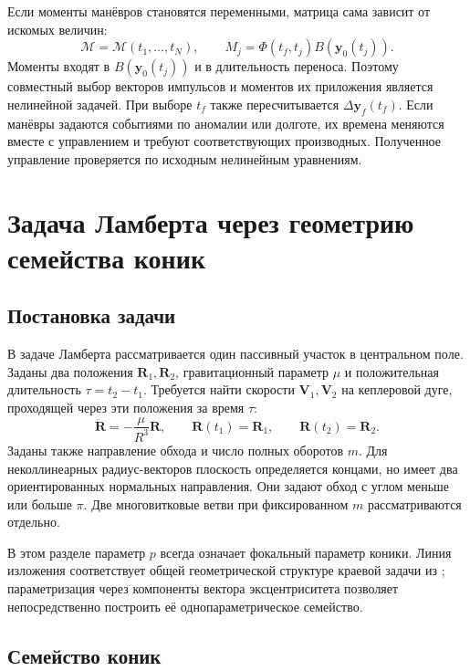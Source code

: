 \documentclass[a4paper,11pt]{article}
\numberwithin{equation}{section}
\theoremstyle{remark}
\newcommand{\vect}[1]{\boldsymbol{#1}}
\begin{document}
Если моменты манёвров становятся переменными, матрица сама
зависит от искомых величин:
\begin{equation}
 \mathcal M=\mathcal M(t_1,\ldots,t_N),\qquad
 M_j=\Phi(t_f,t_j)B(\vect y_0(t_j)).
 \label{eq:free-epochs}
\end{equation}
Моменты входят в $B(\vect y_0(t_j))$ и в длительность переноса.
Поэтому совместный выбор векторов импульсов и моментов
их приложения является нелинейной задачей. При выборе $t_f$ также пересчитывается
$\Delta\vect y_f(t_f)$. Если манёвры задаются событиями
по аномалии или долготе, их времена меняются вместе
с управлением и требуют соответствующих производных.
Полученное управление проверяется по исходным нелинейным уравнениям.

\FloatBarrier
\section{Задача Ламберта через геометрию семейства коник}
\label{sec:lambert}

\subsection{Постановка задачи}

В задаче Ламберта рассматривается один пассивный участок
в центральном поле. Заданы два положения $\vect R_1,\vect R_2$,
гравитационный параметр $\mu$ и положительная длительность
$\tau=t_2-t_1$. Требуется найти скорости $\vect V_1,\vect V_2$
на кеплеровой дуге, проходящей через эти положения за время $\tau$:
\begin{equation}
 \ddot{\vect R}=-\frac{\mu}{R^3}\vect R,
 \qquad \vect R(t_1)=\vect R_1,\qquad
 \vect R(t_2)=\vect R_2.
 \label{eq:lambert-boundary}
\end{equation}
Заданы также направление обхода и число полных оборотов $m$.
Для неколлинеарных радиус-векторов плоскость определяется
концами, но имеет два ориентированных нормальных направления.
Они задают обход с углом меньше или больше $\pi$.
Две многовитковые ветви при фиксированном $m$ рассматриваются отдельно.

В этом разделе параметр $p$ всегда означает фокальный параметр
коники. Линия изложения соответствует общей геометрической
структуре краевой задачи из \cite[\S~5.2]{bmw}; параметризация
через компоненты вектора эксцентриситета позволяет непосредственно
построить её однопараметрическое семейство.

\subsection{Семейство коник}
\end{document}

